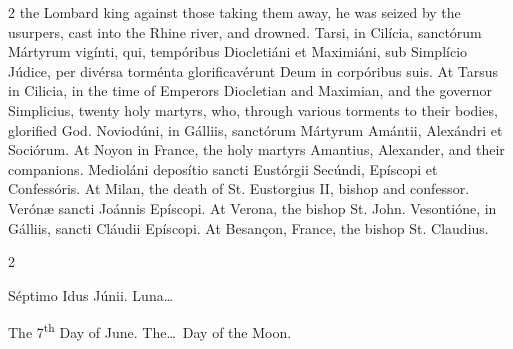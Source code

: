 \begin{paracol}{2}
 the Lombard king against those taking them away, he was seized by the 
 usurpers, cast into the Rhine river, and drowned.
\switchcolumn*
{}
Tarsi, in Cilícia, 
 sanctórum Mártyrum vigínti, qui, tempóribus Diocletiáni et Maximiáni, sub 
 Simplício Júdice, per divérsa torménta glorificavérunt Deum in corpóribus 
 suis.
\switchcolumn
{}
At Tarsus in Cilicia, in the time of 
 Emperors Diocletian and Maximian, and the governor Simplicius, twenty holy 
 martyrs, who, through various torments to their bodies, glorified God.
\switchcolumn*
{}
Noviodúni, in Gálliis, 
 sanctórum Mártyrum Amántii, Alexándri et Sociórum.
\switchcolumn
{}
At Noyon in France, the holy martyrs 
 Amantius, Alexander, and their companions.
\switchcolumn*
{}
Medioláni deposítio 
 sancti Eustórgii Secúndi, Epíscopi et Confessóris.
\switchcolumn
{}
At Milan, the death of St. 
 Eustorgius II, bishop and confessor.
\switchcolumn*
{}
Verónæ sancti Joánnis 
 Epíscopi.
\switchcolumn
{}
At Verona, the bishop St. John.
\switchcolumn*
{}
Vesontióne, in Gálliis, 
 sancti Cláudii Epíscopi.
\switchcolumn
{}
At Besançon, France, the bishop St. 
 Claudius.
\switchcolumn*
{}
\end{paracol}


\begin{paracol}{2}
\begin{center}{\color{gregoriocolor} Séptimo Idus Júnii. 
 Luna\dots\ }\end{center}
\switchcolumn
{}
\begin{center}{\color{gregoriocolor} The 7\textsuperscript{th} Day of 
 June. The\dots\ Day of the Moon.}\end{center}
\end{paracol}

